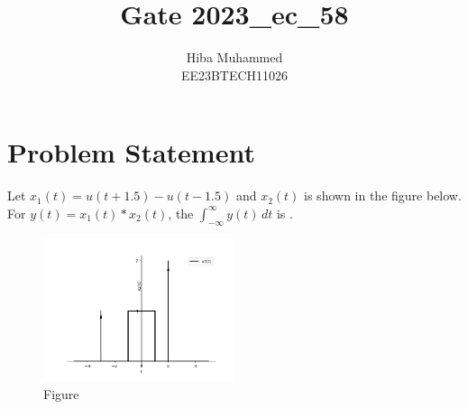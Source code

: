 \documentclass[12pt]{article}
\title{Gate 2023\_ec\_58}
\author{Hiba Muhammed \\
        EE23BTECH11026}
\begin{document}
\maketitle

\section*{Problem Statement}

Let $x_1(t) = u(t + 1.5) - u(t - 1.5)$ and $x_2(t)$ is shown in the figure below. For $y(t) = x_1(t) * x_2(t)$, the $\int_{-\infty}^{\infty} y(t) \, dt$ is \underline{\hspace{2cm}}.

\begin{figure}[htbp]
    \centering
    \includegraphics[width=0.5\textwidth]{2023/EC/58/figs/gatefig.png}
    \caption{Figure}
    \label{fig:graph}
\end{figure}

\end{document}
